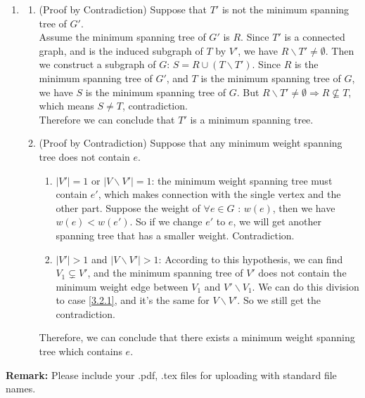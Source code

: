 \documentclass[12pt,a4paper]{article}
\makeatletter
\newtheorem*{solution}{Solution}
\theoremstyle{definition}
\renewenvironment{solution}[1][Solution] {\par\pushQED{\qed}\normalfont\topsep6\p@\@plus6\p@\relax\trivlist\item[\hskip\labelsep\bfseries#1\@addpunct{.}]\ignorespaces}{\popQED\endtrivlist\@endpefalse} \makeatother
\makeatother
\begin{document}
\begin{enumerate}
	\begin{solution}
		\begin{enumerate}
			\item (Proof by Contradiction) Suppose that $ T' $ is not the minimum spanning tree of $ G' $.\\
			Assume the minimum spanning tree of $ G' $ is $ R $. Since $ T' $ is a connected graph, and is the induced subgraph of $ T $ by $ V' $, we have $ R\backslash T'\neq \emptyset $. Then we construct a subgraph of $ G $: $S =  R\cup(T\backslash T') $. Since $ R $ is the minimum spanning tree of $ G' $, and $ T $ is the minimum spanning tree of $ G $, we have $ S $ is the minimum spanning tree of $ G $. But $ R\backslash T'\neq \emptyset \Rightarrow R \nsubseteq T$, which means $ S\neq T $, contradiction.\\
			Therefore we can conclude that $T'$ is a minimum spanning tree.
			\item (Proof by Contradiction) Suppose that any minimum weight spanning tree does not contain $ e $.\\
			\begin{enumerate}
				\item \label{3.2.1}$ |V'|  = 1$ or $ |V\backslash V'| = 1 $: the minimum weight spanning tree must contain $ e' $, which makes connection with the single vertex and the other part. Suppose the weight of $ \forall e \in G\text{ : } w(e)$, then we have $ w(e) < w(e') $. So if we change $ e' $ to $ e $,  we will get another spanning tree that has a smaller weight. Contradiction.
				\item $ |V'|> 1$ and $ |V\backslash V'| > 1 $: According to this hypothesis, we can find $ V_1\subsetneq V'$, and the minimum spanning tree of $ V' $ does not contain the minimum weight edge between $ V_1$ and $ V'\backslash V_1 $. We can do this division to case \ref{3.2.1}, and it's the same for $ V\backslash V' $. So we still get the contradiction.
			\end{enumerate} 
			Therefore, we can conclude that there exists a minimum weight spanning tree which contains $ e $.
		\end{enumerate}
	\end{solution}
\end{enumerate}



\textbf{Remark:} Please include your .pdf, .tex files for uploading with standard file names.


\end{document}
